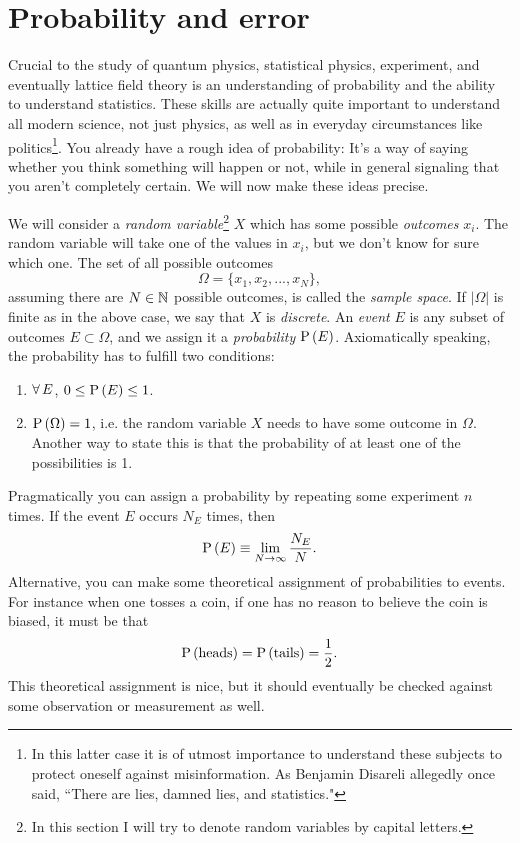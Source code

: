 \section{Probability and error}\label{sec:probAndError}

Crucial to the study of quantum physics, statistical physics, experiment, and
eventually lattice field theory is an understanding of probability and the
ability to understand statistics. These skills are actually quite important to
understand all modern science, not just physics, as well as in everyday
circumstances like politics\footnote{In this latter case it is of utmost
importance to understand these subjects to protect oneself against
misinformation. As Benjamin Disareli allegedly once said, ``There are lies,
damned lies, and statistics."}.
You already have a rough idea of probability: It's a way of saying whether you
think something will happen or not, while in general signaling that you aren't
completely certain. We will now make these ideas precise.

We will consider a {\it random variable}\footnote{In this
section I will try to denote random variables by capital letters.} $X$ which
has some possible {\it outcomes} $x_i$. The random variable will take 
one of the values in $x_i$, but we don't know for sure which one.
The set of all possible outcomes
\begin{equation}
  \Omega=\{x_1,x_2,...,x_N\},
\end{equation}
assuming there are $N\in\mathbb{N}$ possible outcomes, is called the {\it sample
space}. If $|\Omega|$ is finite as in the above case, we
say that $X$ is {\it discrete}. An {\it event} $E$
is any subset of outcomes $E\subset\Omega$, and we assign it a {\it
probability} $\operatorname{P}\left(E\right)$. Axiomatically speaking, the
probability has to fulfill two conditions:
\begin{enumerate}
  \item $\operatorname{\forall} E$, $0\leq\operatorname{P}\left(E\right)\leq1$.
  \item $\operatorname{P}\left(\Omega\right)=1$, i.e. the random variable $X$ needs to have some outcome
in $\Omega$. Another way to state this is that the probability of at least one
of the possibilities is 1. 
\end{enumerate}

Pragmatically you can assign a probability by repeating some experiment $n$
times. If the event $E$ occurs $N_E$ times, then
\begin{equation}
  \operatorname{P}\left(E\right)\equiv\lim_{N\to\infty}\frac{N_E}{N}.
\end{equation}
Alternative, you can make some theoretical assignment of probabilities to
events. For instance when one tosses a coin, if one has no reason to believe the
coin is biased, it must be that
\begin{equation}
\operatorname{P}\left(\text{heads}\right)=\operatorname{P}\left(\text{tails}\right)=\frac{1}{2}.
\end{equation}
This theoretical assignment is nice, but it should eventually be checked against
some observation or measurement as well.

